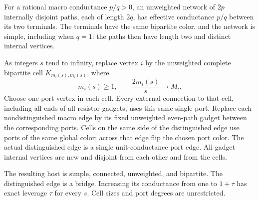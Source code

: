 \documentclass[11pt]{article}
\begin{document}
For a rational macro conductance $p/q>0$, an unweighted network of
$2p$ internally disjoint paths, each of length $2q$, has effective
conductance $p/q$ between its two terminals. The terminals have the
same bipartite color, and the network is simple, including when $q=1$:
the paths then have length two and distinct internal vertices.

As integers $s$ tend to infinity, replace vertex $i$ by the
unweighted complete bipartite cell $K_{m_i(s),m_i(s)}$, where
\[
 m_i(s)\ge1,\qquad \frac{2m_i(s)}s\longrightarrow M_i.
\]
Choose one port vertex in each cell. Every external connection to
that cell, including all ends of all resistor gadgets, uses this
same single port. Replace each nondistinguished macro edge by its
fixed unweighted even-path gadget between the corresponding ports.
Cells on the same side of the distinguished edge use ports of the
same global color; across that edge flip the chosen port color.
The actual distinguished edge is a single unit-conductance port edge.
All gadget internal vertices are new and disjoint from each other and
from the cells.

The resulting host is simple, connected, unweighted, and bipartite.
The distinguished edge is a bridge. Increasing its conductance from
one to $1+\tau$ has exact leverage $\tau$ for every $s$.
Cell sizes and port degrees are unrestricted.
\end{document}
